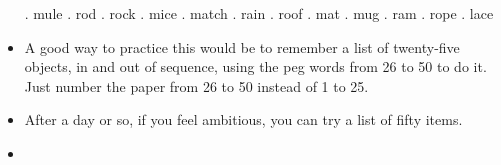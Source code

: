 \begin{itemize}
                . mule
                . rod
                . rock
                . mice
                . match
                . rain
                . roof
                . mat
                . mug
                . ram
                . rope
                . lace
            \item A good way to practice this would be to remember a list
            of twenty-five objects, in and out of sequence, using the
            peg words from 26 to 50 to do it. Just number the paper
            from 26 to 50 instead of 1 to 25.
            \item After a day or so, if you
            feel ambitious, you can try a list of fifty items.
            \item
        \end{itemize}

